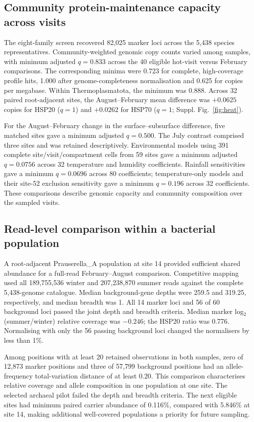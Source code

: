 \subsection*{Community protein-maintenance capacity across visits}

The eight-family screen recovered 82{,}025 marker loci across the 5{,}438 species representatives. Community-weighted genomic copy counts varied among samples, with minimum adjusted $q=0.833$ across the 40 eligible hot-visit versus February comparisons. The corresponding minima were 0.723 for complete, high-coverage profile hits, 1.000 after genome-completeness normalisation and 0.625 for copies per megabase. Within Thermoplasmatota, the minimum was 0.888. Across 32 paired root-adjacent sites, the August--February mean difference was $+0.0625$ copies for HSP20 ($q=1$) and $+0.0262$ for HSP70 ($q=1$; Suppl. Fig.~\ref{fig:heat}).

For the August--February change in the surface--subsurface difference, five matched sites gave a minimum adjusted $q=0.500$. The July contrast comprised three sites and was retained descriptively. Environmental models using 391 complete site/visit/compartment cells from 59 sites gave a minimum adjusted $q=0.0756$ across 32 temperature and humidity coefficients. Rainfall sensitivities gave a minimum $q=0.0696$ across 80 coefficients; temperature-only models and their site-52 exclusion sensitivity gave a minimum $q=0.196$ across 32 coefficients. These comparisons describe genomic capacity and community composition over the sampled visits.

\subsection*{Read-level comparison within a bacterial population}

A root-adjacent Prauserella\_A population at site 14 provided sufficient shared abundance for a full-read February--August comparison. Competitive mapping used all 189{,}755{,}536 winter and 207{,}238{,}870 summer reads against the complete 5{,}438-genome catalogue. Median background-gene depths were 259.5 and 319.25, respectively, and median breadth was 1. All 14 marker loci and 56 of 60 background loci passed the joint depth and breadth criteria. Median marker log$_2$(summer/winter) relative coverage was $-0.246$; the HSP20 ratio was 0.776. Normalising with only the 56 passing background loci changed the normalisers by less than 1\%.

Among positions with at least 20 retained observations in both samples, zero of 12{,}873 marker positions and three of 57{,}799 background positions had an allele-frequency total-variation distance of at least 0.20. This comparison characterises relative coverage and allele composition in one population at one site. The selected archaeal pilot failed the depth and breadth criteria. The next eligible sites had minimum paired carrier abundance of 0.116\%, compared with 5.846\% at site 14, making additional well-covered populations a priority for future sampling.

